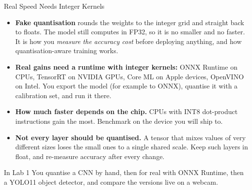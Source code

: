 \begin{frame}{Real Speed Needs Integer Kernels}
    \begin{itemize}
        \setlength\itemsep{0.45em}
        \item \textbf{Fake quantisation} rounds the weights to the integer grid and straight back to floats. The model
              still computes in FP32, so it is no smaller and no faster. It is how you \emph{measure the accuracy
              cost} before deploying anything, and how quantisation-aware training works.
        \item \textbf{Real gains need a runtime with integer kernels:} ONNX Runtime on CPUs, TensorRT on NVIDIA GPUs,
              Core ML on Apple devices, OpenVINO on Intel. You export the model (for example to ONNX), quantise it
              with a calibration set, and run it there.
        \item \textbf{How much faster depends on the chip.} CPUs with INT8 dot-product instructions gain the most.
              Benchmark on the device you will ship to.
        \item \textbf{Not every layer should be quantised.} A tensor that mixes values of very different sizes loses
              the small ones to a single shared scale. Keep such layers in float, and re-measure accuracy after
              every change.
    \end{itemize}
    \vspace{0.3em}
    \begin{block}{In Lab 1}
        You quantise a CNN by hand, then for real with ONNX Runtime, then a YOLO11 object detector, and compare the
        versions live on a webcam.
    \end{block}
\end{frame}
